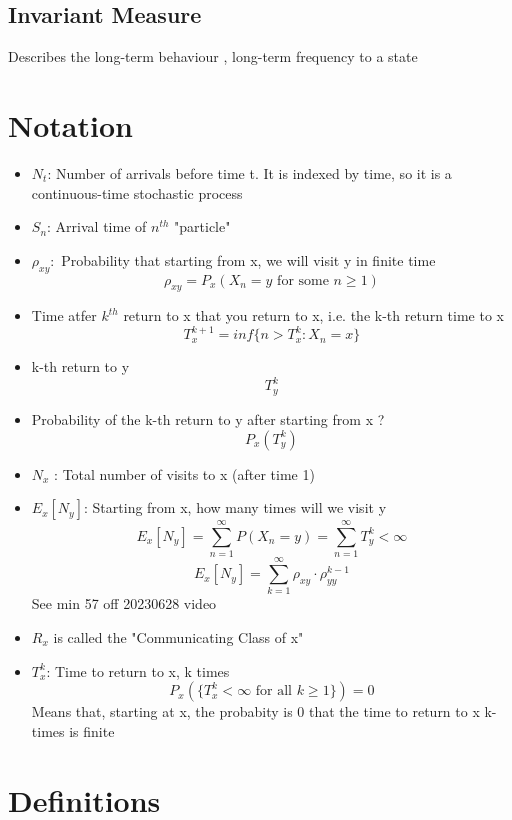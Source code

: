 \documentclass{report}
\begin{document}
    \section{Invariant Measure}%
    Describes the long-term behaviour , long-term frequency to 
    a state

    

\chapter*{Notation}%
  \begin{itemize}
      \item $N_t$: Number of arrivals before time t.  It is indexed by
        time, so it is a continuous-time stochastic process
      \item $S_n$: Arrival time of $n^{th}$ "particle"
      \item $\rho_{xy}: $ Probability that starting from x, we will visit y in finite time
        \[ \rho_{xy} = P_x(X_n = y \text{ for some  } n \geq 1) \]
      \item Time atfer $k^{th}$ return to x that you return to x, i.e. the k-th return time to x
        \[ T^{k+1}_x = inf \{n > T_x^k : X_n = x \}  \]
      \item k-th return to y
        \[ T^k_y \]
      \item Probability of the k-th return to y after starting from x ?
        \[ P_x(T^k_y) \]
      \item $N_x$ : Total number of visits to x (after time 1)
      \item $E_x[N_y]$: Starting from x, how many times will we visit y
          \[ E_x[N_y] = \sum^{\infty}_{n=1} P(X_n=y) = \sum^{\infty}_{n=1} T_y^k < \infty  \]
          \[ E_x[N_y] = \sum^{\infty}_{k=1} \rho_{xy} \cdot \rho^{k-1}_{yy}   \]
            See min 57 off 20230628 video
      \item $R_x$ is called the "Communicating Class of x"
      \item $T^k_x$: Time to return to x, k times
        \[ P_x(\{T^k_x < \infty \text{ for all } k \geq 1\}) = 0 \]
        Means that, starting at x, the probabity is 0 that the time to return to x k-times is finite
  \end{itemize}

\chapter*{Definitions}%
\end{document}
